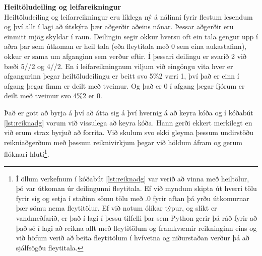 \begin{itarefni}
\textbf{Heiltöludeiling og leifareikningur}\\
	Heiltöludeiling og leifarreikningur eru líklega ný á nálinni fyrir flestum lesendum og því allt í lagi að útskýra þær aðgerðir aðeins nánar.
	Þessar aðgerðir eru einmitt mjög skyldar í raun.
	Deilingin segir okkur hversu oft ein tala gengur upp í aðra þar sem útkoman er heil tala (eða fleytitala með 0 sem eina aukastafinn), okkur er sama um afganginn sem verður eftir.
	Í þessari deilingu er svarið 2 við bæði 5//2 og 4//2.
	En í leifareikningnum viljum við eingöngu vita hver er afgangurinn þegar heiltöludeilingu er beitt svo 5\%2 væri 1, því það er einn í afgang þegar fimm er deilt með tveimur.
	Og það er 0 í afgang þegar fjórum er deilt með tveimur svo 4\%2 er 0.
\end{itarefni}

Það er gott að byrja á því að átta sig á því hvernig á að keyra kóða og í kóðabút \ref{lst:reiknadg} vorum við vissulega að keyra kóða.
Hann gerði ekkert merkilegt en við erum strax byrjuð að forrita.
Við skulum svo ekki gleyma þessum undirstöðu reikniaðgerðum með þessum reiknivirkjum þegar við höldum áfram og gerum flóknari hluti\footnote{
	Í öllum verkefnum í kóðabút \ref{lst:reiknadg} var verið að vinna með heiltölur, þó var útkoman úr deilingunni fleytitala. 
	Ef við myndum skipta út hverri tölu fyrir sig og setja í staðinn sömu tölu með .0 fyrir aftan þá yrðu útkomurnar þær sömu nema fleytitölur. 
	Ef við notum ólíkar týpur, og slíkt er vandmeðfarið, er það í lagi í þessu tilfelli þar sem Python gerir þá ráð fyrir að það sé í lagi að reikna allt með fleytitölum og framkvæmir reikninginn eins og við höfum verið að beita fleytitölum í hvívetna og niðurstaðan verður þá að sjálfsögðu fleytitala.
}.

